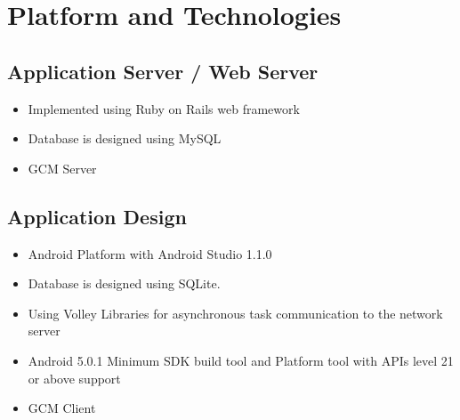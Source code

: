 \chapter{Platform and Technologies}


\section{Application Server / Web Server}
\begin{itemize}
  \item Implemented using Ruby on Rails web framework \cite{Ruby}
  \item Database is designed using MySQL
  \item GCM Server
\end{itemize}

\section{Application Design}

\begin{itemize}
\item Android Platform with Android Studio 1.1.0 \cite{Intro42:online}
\item Database is designed using SQLite.
\item Using Volley Libraries for asynchronous task communication to the network server \cite{Andro34:online}
\item Android 5.0.1 Minimum SDK build tool and Platform tool with APIs level 21 or above support
\item GCM Client

\end{itemize}
